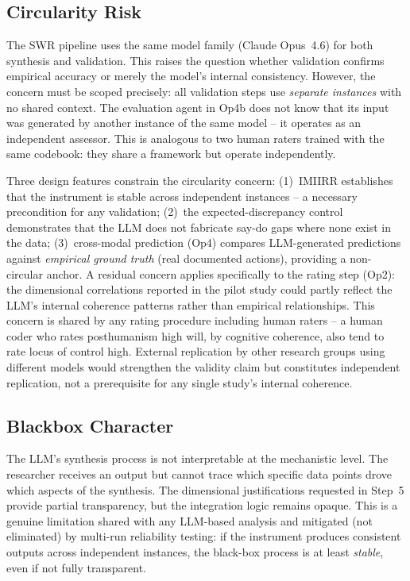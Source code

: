 \documentclass[11pt,a4paper]{article}
\begin{document}
\subsection{Circularity Risk}
\label{sec:limitations:circularity}

The SWR pipeline uses the same model family (Claude Opus~4.6) for both synthesis and validation. This raises the question whether validation confirms empirical accuracy or merely the model's internal consistency. However, the concern must be scoped precisely: all validation steps use \emph{separate instances} with no shared context. The evaluation agent in Op4b does not know that its input was generated by another instance of the same model -- it operates as an independent assessor. This is analogous to two human raters trained with the same codebook: they share a framework but operate independently.

Three design features constrain the circularity concern: (1)~IMIIRR establishes that the instrument is stable across independent instances -- a necessary precondition for any validation; (2)~the expected-discrepancy control demonstrates that the LLM does not fabricate say-do gaps where none exist in the data; (3)~cross-modal prediction (Op4) compares LLM-generated predictions against \emph{empirical ground truth} (real documented actions), providing a non-circular anchor. A residual concern applies specifically to the rating step (Op2): the dimensional correlations reported in the pilot study could partly reflect the LLM's internal coherence patterns rather than empirical relationships. This concern is shared by any rating procedure including human raters -- a human coder who rates posthumanism high will, by cognitive coherence, also tend to rate locus of control high. External replication by other research groups using different models would strengthen the validity claim but constitutes independent replication, not a prerequisite for any single study's internal coherence.


\subsection{Blackbox Character}
\label{sec:limitations:blackbox}

The LLM's synthesis process is not interpretable at the mechanistic level. The researcher receives an output but cannot trace which specific data points drove which aspects of the synthesis. The dimensional justifications requested in Step~5 provide partial transparency, but the integration logic remains opaque. This is a genuine limitation shared with any LLM-based analysis and mitigated (not eliminated) by multi-run reliability testing: if the instrument produces consistent outputs across independent instances, the black-box process is at least \emph{stable}, even if not fully transparent.
\end{document}
